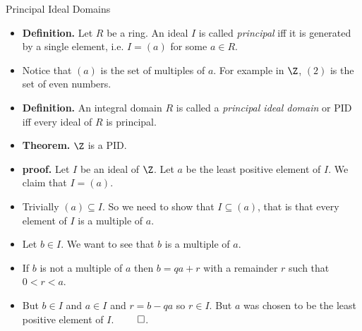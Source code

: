 \documentclass{beamer}
\begin{document}

\begin{frame}{Principal Ideal Domains}

\begin{itemize}
  \item \textbf{Definition.} Let $R$ be a ring. An ideal $I$ is called \emph{principal} iff it is generated by a single element, i.e.
  $I=(a)$ for some $a\in R$.
  \item Notice that $(a)$ is the set of multiples of $a$. For example in $\Z$, $(2)$ is the set of even numbers.
  \item \textbf{Definition.} An integral domain $R$ is called a \emph{principal ideal domain} or PID iff every ideal of $R$ is principal.
  \item \textbf{Theorem.} $\Z$ is a PID.
  \item \textbf{proof.} Let $I$ be an ideal of $\Z$. Let $a$ be the least positive element of $I$. We claim that $I=(a)$.
  \item Trivially $(a) \subseteq I$. So we need to show that $I \subseteq (a)$, that is that every element of $I$ is a multiple of $a$.
  \item Let $b\in I$. We want to see that $b$ is a multiple of $a$.
  \item If $b$ is not a multiple of $a$ then $b=qa+r$ with a remainder $r$ such that $0<r <a$.
  \item But $b\in I$ and $a\in I$ and $r = b -qa$ so $r\in I$. But $a$ was chosen to be the least positive element of $I$. $\qed$.
\end{itemize}

\end{frame}


\end{document}
